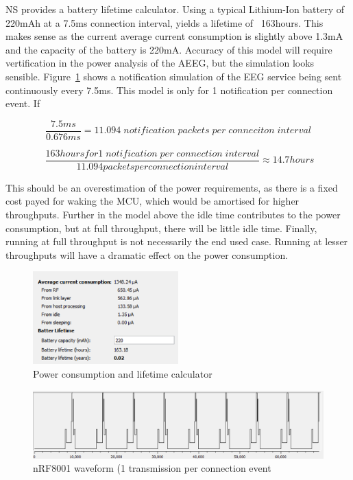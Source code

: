 \documentclass[]{article}
\begin{document}
\ac{NS} provides a battery lifetime calculator. Using a typical Lithium-Ion battery of 220mAh at a 7.5ms connection interval, yields a lifetime of ~163hours. This makes sense as the current average current consumption is slightly above 1.3mA and the capacity of the battery is 220mA. Accuracy of this model will require vertification in the power analysis of the \ac{AEEG}, but the simulation looks sensible. Figure~\ref{fig:nrfsim} shows a notification simulation of the EEG service being sent continuously every 7.5ms. This model is only for 1 notification per connection event. If 

\begin{displaymath}
\frac{7.5ms}{0.676ms} = 11.094\; notification\; packets\; per\; conneciton\; interval
\end{displaymath}

\begin{displaymath}
\;
\frac{163 hours for 1 \;notification\; per\; connection\; interval}{11.094 packets per connection interval} \approx 14.7 hours
\end{displaymath}


This should be an overestimation of the power requirements, as there is a fixed cost payed for waking the MCU, which would be amortised for higher throughputs. Further in the model above the idle time contributes to the power consumption, but at full throughput, there will be little idle time. Finally, running at full throughput is not necessarily the end used case. Running at lesser throughputs will have a dramatic effect on the power consumption.
 

\begin{figure}[htb]
	\begin{center}
		\includegraphics[width = 0.5\textwidth]{nrfsim}
	\end{center}
	\caption{Power consumption and lifetime calculator}
	\label{fig:nrfsim}
\end{figure}

\begin{figure}[htb]
	\begin{center}
		\includegraphics[width = 1.1\textwidth]{nrfwave}
	\end{center}
	\caption{nRF8001 waveform (1 transmission per connection event}
	\label{fig:nrfwave}
\end{figure}
\end{document}
